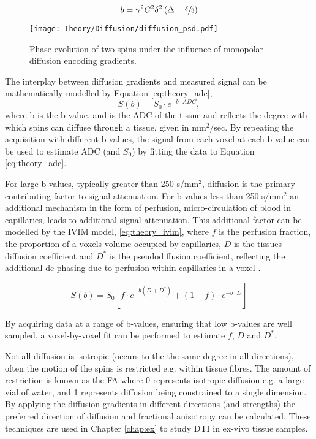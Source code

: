 \begin{equation}
	b=\gamma^2 G^2 \delta^2 \left( \Delta - \sfrac{\delta}{3}\right)
	\label{eq:theory_stejskal_tanner}
\end{equation}

\begin{figure}[H]
	\centering
	\texttt{[image: Theory/Diffusion/diffusion\_psd.pdf]}
	\caption{Phase evolution of two spins under the influence of monopolar diffusion encoding gradients.}
	\label{fig:theory_diffusion_psd}	
\end{figure}

The interplay between diffusion gradients and measured signal can be mathematically modelled by Equation \eqref{eq:theory_adc},
\begin{equation}
	S\left( b \right) = S_0 \cdot e^{-b \cdot ADC},
	\label{eq:theory_adc}
\end{equation}
where b is the b-value, and  is the \acl{ADC} of the tissue and reflects the degree with which spins can diffuse through a tissue, given in mm$^2$/sec. By repeating the acquisition with different b-values, the signal from each voxel at each b-value can be used to estimate \ac{ADC} (and $S_0$) by fitting the data to Equation \eqref{eq:theory_adc}.

For large b-values, typically greater than 250 s/mm$^2$, diffusion is the primary contributing factor to signal attenuation. For b-values less than 250 s/mm$^2$ an additional mechanism in the form of perfusion, micro-circulation of blood in capillaries, leads to additional signal attenuation. This additional factor can be modelled by the \ac{IVIM} model, \eqref{eq:theory_ivim}, where $f$ is the perfusion fraction, the proportion of a voxels volume occupied by capillaries, $D$ is the tissues diffusion coefficient and $D^*$ is the pseudodiffusion coefficient, reflecting the additional de-phasing due to perfusion within capillaries in a voxel \cite{le_bihan_mr_1986,le_bihan_separation_1988}.

\begin{equation}
	S\left( b \right) = S_0 \left[ f \cdot e^{-b\left(D + D^*\right)} + \left( 1 - f\right) \cdot e^{-b \cdot D}\right]
	\label{eq:theory_ivim}
\end{equation}

By acquiring data at a range of b-values, ensuring that low b-values are well sampled, a voxel-by-voxel fit can be performed to estimate $f$, $D$ and $D^*$.

Not all diffusion is isotropic (occurs to the the same degree in all directions), often the motion of the spins is restricted e.g. within tissue fibres. The amount of restriction is known as the \ac{FA} where 0 represents isotropic diffusion e.g. a large vial of water, and 1 represents diffusion being constrained to a single dimension. By applying the diffusion gradients in different directions (and strengths) the preferred direction of diffusion and fractional anisotropy can be calculated. These techniques are used in Chapter \ref{chap:ex} to study \ac{DTI} in ex-vivo tissue samples.

